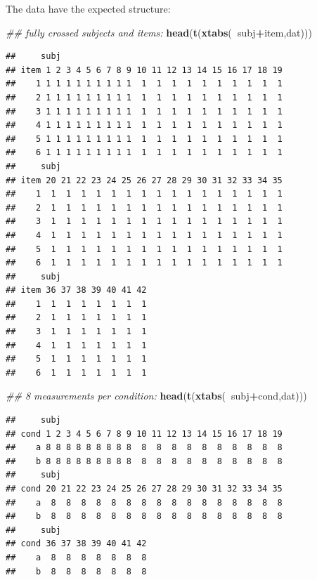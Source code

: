 \documentclass[12pt,]{krantz}
\newenvironment{Shaded}{\begin{snugshade}}{\end{snugshade}}
\newcommand{\CommentTok}[1]{\textcolor[rgb]{0.56,0.35,0.01}{\textit{#1}}}
\newcommand{\KeywordTok}[1]{\textcolor[rgb]{0.13,0.29,0.53}{\textbf{#1}}}
\newcommand{\NormalTok}[1]{#1}
\newcommand{\OperatorTok}[1]{\textcolor[rgb]{0.81,0.36,0.00}{\textbf{#1}}}
\begin{document}
The data have the expected structure:

\begin{Shaded}
\begin{Highlighting}[]
\CommentTok{## fully  crossed subjects and items:}
\KeywordTok{head}\NormalTok{(}\KeywordTok{t}\NormalTok{(}\KeywordTok{xtabs}\NormalTok{(}\OperatorTok{~}\NormalTok{subj}\OperatorTok{+}\NormalTok{item,dat)))}
\end{Highlighting}
\end{Shaded}

\begin{verbatim}
##     subj
## item 1 2 3 4 5 6 7 8 9 10 11 12 13 14 15 16 17 18 19
##    1 1 1 1 1 1 1 1 1 1  1  1  1  1  1  1  1  1  1  1
##    2 1 1 1 1 1 1 1 1 1  1  1  1  1  1  1  1  1  1  1
##    3 1 1 1 1 1 1 1 1 1  1  1  1  1  1  1  1  1  1  1
##    4 1 1 1 1 1 1 1 1 1  1  1  1  1  1  1  1  1  1  1
##    5 1 1 1 1 1 1 1 1 1  1  1  1  1  1  1  1  1  1  1
##    6 1 1 1 1 1 1 1 1 1  1  1  1  1  1  1  1  1  1  1
##     subj
## item 20 21 22 23 24 25 26 27 28 29 30 31 32 33 34 35
##    1  1  1  1  1  1  1  1  1  1  1  1  1  1  1  1  1
##    2  1  1  1  1  1  1  1  1  1  1  1  1  1  1  1  1
##    3  1  1  1  1  1  1  1  1  1  1  1  1  1  1  1  1
##    4  1  1  1  1  1  1  1  1  1  1  1  1  1  1  1  1
##    5  1  1  1  1  1  1  1  1  1  1  1  1  1  1  1  1
##    6  1  1  1  1  1  1  1  1  1  1  1  1  1  1  1  1
##     subj
## item 36 37 38 39 40 41 42
##    1  1  1  1  1  1  1  1
##    2  1  1  1  1  1  1  1
##    3  1  1  1  1  1  1  1
##    4  1  1  1  1  1  1  1
##    5  1  1  1  1  1  1  1
##    6  1  1  1  1  1  1  1
\end{verbatim}

\begin{Shaded}
\begin{Highlighting}[]
\CommentTok{##  8 measurements per condition:}
\KeywordTok{head}\NormalTok{(}\KeywordTok{t}\NormalTok{(}\KeywordTok{xtabs}\NormalTok{(}\OperatorTok{~}\NormalTok{subj}\OperatorTok{+}\NormalTok{cond,dat)))}
\end{Highlighting}
\end{Shaded}

\begin{verbatim}
##     subj
## cond 1 2 3 4 5 6 7 8 9 10 11 12 13 14 15 16 17 18 19
##    a 8 8 8 8 8 8 8 8 8  8  8  8  8  8  8  8  8  8  8
##    b 8 8 8 8 8 8 8 8 8  8  8  8  8  8  8  8  8  8  8
##     subj
## cond 20 21 22 23 24 25 26 27 28 29 30 31 32 33 34 35
##    a  8  8  8  8  8  8  8  8  8  8  8  8  8  8  8  8
##    b  8  8  8  8  8  8  8  8  8  8  8  8  8  8  8  8
##     subj
## cond 36 37 38 39 40 41 42
##    a  8  8  8  8  8  8  8
##    b  8  8  8  8  8  8  8
\end{verbatim}
\end{document}
